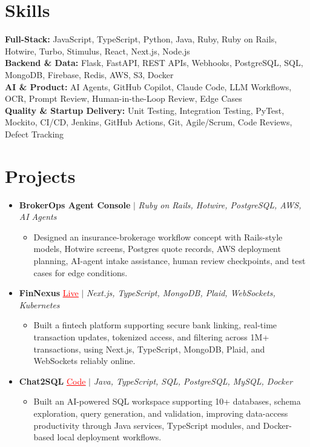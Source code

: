 \documentclass[letterpaper,10pt]{article}
\newcommand{\itemTail}{\vspace{-4pt}}
\newcommand{\sectionGap}{\vspace{-8pt}}
\newcommand{\projGap}{\vspace{1pt}}
\newcommand{\resumeItem}[1]{\item\small{{#1 \itemTail}}}
\newcommand{\resumeProjectHeading}[1]{\item \small #1 \vspace{-2pt}}
\newcommand{\resumeProjectLink}[2]{\href{#1}{\textcolor{red}{\underline{#2}}}}
\newcommand{\resumeSubHeadingListStart}{\begin{itemize}[leftmargin=0.0in, label={}]}
\newcommand{\resumeSubHeadingListEnd}{\end{itemize}}
\newcommand{\resumeProjItemListStart}{\begin{itemize}[leftmargin=0.15in,label=\textbullet,itemsep=3pt,topsep=0pt,parsep=0pt,partopsep=0pt]}
\newcommand{\resumeProjItemListEnd}{\end{itemize}\vspace{-4pt}}
\begin{document}
\section{Skills}
\begin{itemize}[leftmargin=0.15in, label={}]
\small{\item{
\textbf{Full-Stack:} JavaScript, TypeScript, Python, Java, Ruby, Ruby on Rails, Hotwire, Turbo, Stimulus, React, Next.js, Node.js \\
\textbf{Backend \& Data:} Flask, FastAPI, REST APIs, Webhooks, PostgreSQL, SQL, MongoDB, Firebase, Redis, AWS, S3, Docker \\
\textbf{AI \& Product:} AI Agents, GitHub Copilot, Claude Code, LLM Workflows, OCR, Prompt Review, Human-in-the-Loop Review, Edge Cases \\
\textbf{Quality \& Startup Delivery:} Unit Testing, Integration Testing, PyTest, Mockito, CI/CD, Jenkins, GitHub Actions, Git, Agile/Scrum, Code Reviews, Defect Tracking
}}
\end{itemize}
\sectionGap
\section{Projects}
\resumeSubHeadingListStart
\vspace{3pt}
\resumeProjectHeading{\textbf{BrokerOps Agent Console} $|$ \emph{Ruby on Rails, Hotwire, PostgreSQL, AWS, AI Agents}}
\resumeProjItemListStart
\resumeItem{Designed an insurance-brokerage workflow concept with Rails-style models, Hotwire screens, Postgres quote records, AWS deployment planning, AI-agent intake assistance, human review checkpoints, and test cases for edge conditions.}
\resumeProjItemListEnd
\projGap
\resumeProjectHeading{\textbf{FinNexus} \resumeProjectLink{https://fin-nexus.vercel.app/}{Live} $|$ \emph{Next.js, TypeScript, MongoDB, Plaid, WebSockets, Kubernetes}}
\resumeProjItemListStart
\resumeItem{Built a fintech platform supporting secure bank linking, real-time transaction updates, tokenized access, and filtering across 1M+ transactions, using Next.js, TypeScript, MongoDB, Plaid, and WebSockets reliably online.}
\resumeProjItemListEnd
\projGap
\resumeProjectHeading{\textbf{Chat2SQL} \resumeProjectLink{https://github.com/SAHAJ-BHADJA/Chat2SQL}{Code} $|$ \emph{Java, TypeScript, SQL, PostgreSQL, MySQL, Docker}}
\resumeProjItemListStart
\resumeItem{Built an AI-powered SQL workspace supporting 10+ databases, schema exploration, query generation, and validation, improving data-access productivity through Java services, TypeScript modules, and Docker-based local deployment workflows.}
\resumeProjItemListEnd
\resumeSubHeadingListEnd
\end{document}

